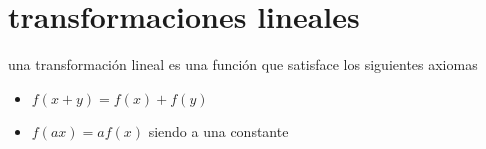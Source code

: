 \section{transformaciones lineales}
una transformación lineal es una función que satisface los siguientes axiomas
\begin{itemize}
\item $f(x+y)=f(x)+f(y)$
\item $f(ax)=af(x)$ siendo a una constante
\end{itemize}
